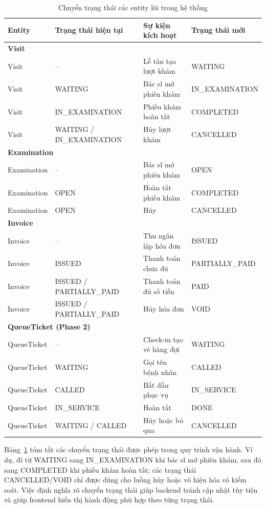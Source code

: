\begin{longtable}{|p{2.6cm}|p{3.5cm}|p{4.8cm}|p{3.4cm}|}
\caption{Chuyển trạng thái các entity lõi trong hệ thống}\label{tab:state-transitions}\\
\hline
\textbf{Entity} & \textbf{Trạng thái hiện tại} & \textbf{Sự kiện kích hoạt} & \textbf{Trạng thái mới} \\
\hline
\multicolumn{4}{|l|}{\textbf{Visit}} \\
\hline
Visit & -- & Lễ tân tạo lượt khám & WAITING \\
\hline
Visit & WAITING & Bác sĩ mở phiên khám & IN\_\allowbreak EXAMINATION \\
\hline
Visit & IN\_\allowbreak EXAMINATION & Phiếu khám hoàn tất & COMPLETED \\
\hline
Visit & WAITING / IN\_\allowbreak EXAMINATION & Hủy lượt khám & CANCELLED \\
\hline
\multicolumn{4}{|l|}{\textbf{Examination}} \\
\hline
Examination & -- & Bác sĩ mở phiên khám & OPEN \\
\hline
Examination & OPEN & Hoàn tất phiếu khám & COMPLETED \\
\hline
Examination & OPEN & Hủy & CANCELLED \\
\hline
\multicolumn{4}{|l|}{\textbf{Invoice}} \\
\hline
Invoice & -- & Thu ngân lập hóa đơn & ISSUED \\
\hline
Invoice & ISSUED & Thanh toán chưa đủ & PARTIALLY\_PAID \\
\hline
Invoice & ISSUED / PARTIALLY\_PAID & Thanh toán đủ số tiền & PAID \\
\hline
Invoice & ISSUED / PARTIALLY\_PAID & Hủy hóa đơn & VOID \\
\hline
\multicolumn{4}{|l|}{\textbf{QueueTicket (Phase 2)}} \\
\hline
QueueTicket & -- & Check-in tạo vé hàng đợi & WAITING \\
\hline
QueueTicket & WAITING & Gọi tên bệnh nhân & CALLED \\
\hline
QueueTicket & CALLED & Bắt đầu phục vụ & IN\_SERVICE \\
\hline
QueueTicket & IN\_SERVICE & Hoàn tất & DONE \\
\hline
QueueTicket & WAITING / CALLED & Hủy hoặc bỏ qua & CANCELLED \\
\hline
\end{longtable}

Bảng~\ref{tab:state-transitions} tóm tắt các chuyển trạng thái được phép trong quy trình vận hành. Ví dụ,  đi từ WAITING sang IN\_EXAMINATION khi bác sĩ mở phiên khám, sau đó sang COMPLETED khi phiếu khám hoàn tất; các trạng thái CANCELLED/VOID chỉ được dùng cho luồng hủy hoặc vô hiệu hóa có kiểm soát. Việc định nghĩa rõ chuyển trạng thái giúp backend tránh cập nhật tùy tiện và giúp frontend hiển thị hành động phù hợp theo từng trạng thái.

